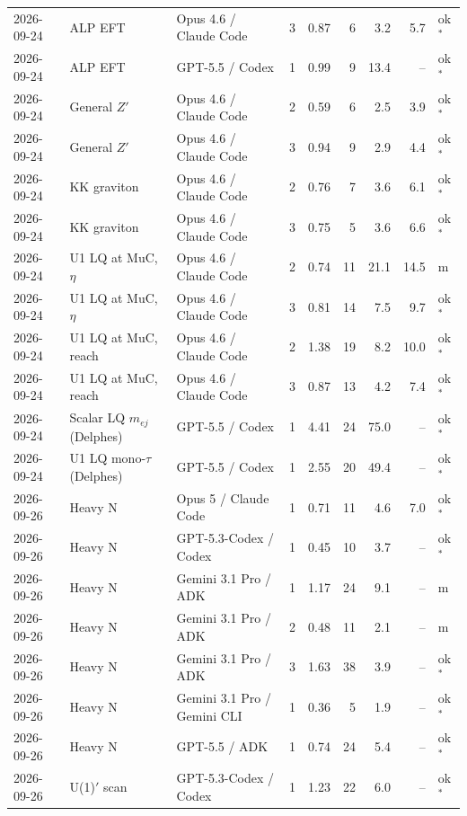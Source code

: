 \begin{longtable}{llllrrrrl}
2026-09-24 & ALP EFT & Opus 4.6 / Claude Code & 3 & 0.87 & 6 & 3.2 & 5.7 & ok$^{*}$ \\
2026-09-24 & ALP EFT & GPT-5.5 / Codex & 1 & 0.99 & 9 & 13.4 & -- & ok$^{*}$ \\
2026-09-24 & General $Z'$ & Opus 4.6 / Claude Code & 2 & 0.59 & 6 & 2.5 & 3.9 & ok$^{*}$ \\
2026-09-24 & General $Z'$ & Opus 4.6 / Claude Code & 3 & 0.94 & 9 & 2.9 & 4.4 & ok$^{*}$ \\
2026-09-24 & KK graviton & Opus 4.6 / Claude Code & 2 & 0.76 & 7 & 3.6 & 6.1 & ok$^{*}$ \\
2026-09-24 & KK graviton & Opus 4.6 / Claude Code & 3 & 0.75 & 5 & 3.6 & 6.6 & ok$^{*}$ \\
2026-09-24 & U1 LQ at MuC, $\eta$ & Opus 4.6 / Claude Code & 2 & 0.74 & 11 & 21.1 & 14.5 & m \\
2026-09-24 & U1 LQ at MuC, $\eta$ & Opus 4.6 / Claude Code & 3 & 0.81 & 14 & 7.5 & 9.7 & ok$^{*}$ \\
2026-09-24 & U1 LQ at MuC, reach & Opus 4.6 / Claude Code & 2 & 1.38 & 19 & 8.2 & 10.0 & ok$^{*}$ \\
2026-09-24 & U1 LQ at MuC, reach & Opus 4.6 / Claude Code & 3 & 0.87 & 13 & 4.2 & 7.4 & ok$^{*}$ \\
2026-09-24 & Scalar LQ $m_{ej}$ (Delphes) & GPT-5.5 / Codex & 1 & 4.41 & 24 & 75.0 & -- & ok$^{*}$ \\
2026-09-24 & U1 LQ mono-$\tau$ (Delphes) & GPT-5.5 / Codex & 1 & 2.55 & 20 & 49.4 & -- & ok$^{*}$ \\
2026-09-26 & Heavy N & Opus 5 / Claude Code & 1 & 0.71 & 11 & 4.6 & 7.0 & ok$^{*}$ \\
2026-09-26 & Heavy N & GPT-5.3-Codex / Codex & 1 & 0.45 & 10 & 3.7 & -- & ok$^{*}$ \\
2026-09-26 & Heavy N & Gemini 3.1 Pro / ADK & 1 & 1.17 & 24 & 9.1 & -- & m \\
2026-09-26 & Heavy N & Gemini 3.1 Pro / ADK & 2 & 0.48 & 11 & 2.1 & -- & m \\
2026-09-26 & Heavy N & Gemini 3.1 Pro / ADK & 3 & 1.63 & 38 & 3.9 & -- & ok$^{*}$ \\
2026-09-26 & Heavy N & Gemini 3.1 Pro / Gemini CLI & 1 & 0.36 & 5 & 1.9 & -- & ok$^{*}$ \\
2026-09-26 & Heavy N & GPT-5.5 / ADK & 1 & 0.74 & 24 & 5.4 & -- & ok$^{*}$ \\
2026-09-26 & U(1)$'$ scan & GPT-5.3-Codex / Codex & 1 & 1.23 & 22 & 6.0 & -- & ok$^{*}$ \\

\end{longtable}
